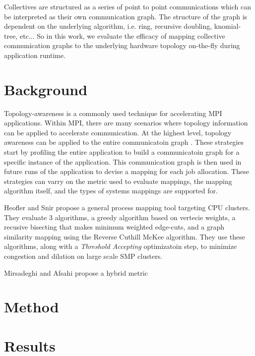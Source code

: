 Collectives are structured as a series of point to point communications which can be interpreted as their own communication graph.
The structure of the graph is dependent on the underlying algorithm, i.e. ring, recursive doubling, knomial-tree, etc...
So in this work, we evaluate the efficacy of mapping collective communication graphs to the underlying hardware topology on-the-fly during application runtime.

\section{Background}
Topology-awareness is a commonly used technique for accelerating MPI applications. 
Within MPI, there are many scenarios where topology information can be applied to accelerate communication.
At the highest level, topology awareness can be applied to the entire communicatoin graph \cite{Hoefler2011GenericTopoMappingStrats, Mirsadeghi2016PTRAM, Faraji2016TopoAwareGPUSelection, Mirsadeghi2016MAGC, Galvez2017AutoTopoMap}.
These strategies start by profiling the entire application to build a communicatoin graph for a specific instance of the application.
This communication graph is then used in future runs of the application to devise a mapping for each job allocation.
These strategies can varry on the metric used to evaluate mappings, the mapping algorithm itself, and the types of systems mappings are supported for.

Heofler and Snir \cite{Hoefler2011GenericTopoMappingStrats} propose a general process mapping tool targeting CPU clusters.
They evaluate 3 algorithms, a greedy algorithm based on vertecie weights, a recusive bisecting that makes minimum weighted edge-cuts, and a graph similarity mapping using the Reverse Cuthill McKee algorithm. 
They use these algorithms, along with a \textit{Threshold Accepting} optimizatoin step, to minimize congestion and dilation on large scale SMP clusters.

Mirsadeghi and Afsahi \cite{Mirsadeghi2016PTRAM} propose a hybrid metric

\section{Method}
\section{Results}
